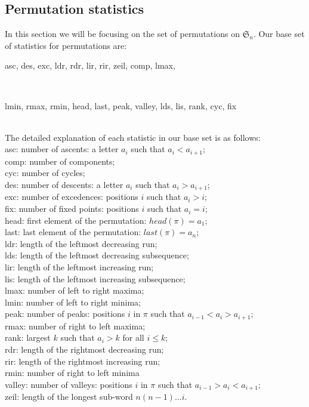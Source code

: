 \documentclass[12pt]{article}
\begin{document}
\subsection{Permutation statistics}
In this section we will be focusing on the set of permutations on $\mathfrak{S}_n$. Our base set of statistics for permutations are:\\ \centerline{asc, des, exc, ldr, rdr, lir, rir, zeil, comp, lmax,}\\
\centerline{lmin, rmax, rmin, head, last, peak, valley, lds, lis, rank, cyc, fix}\\
The detailed explanation of each statistic in our base set is as follows:\\
asc: number of ascents: a letter $a_i$ such that $a_i < a_{i+1}$;\\
comp: number of components;\\
cyc: number of cycles;\\
des: number of descents: a letter $a_i$ such that $a_i > a_{i+1}$;\\
exc: number of excedences: positions $i$ such that $a_i > i$;\\
fix: number of fixed points: positions $i$ such that $a_i = i$;\\
head: first element of the permutation: $head(\pi) = a_1$;\\
last: last element of the permutation: $last(\pi) = a_n$;\\
ldr: length of the leftmost decreasing run;\\
lds: length of the leftmost decreasing subsequence;\\
lir: length of the leftmost increasing run;\\
lis: length of the leftmost increasing subsequence;\\
lmax: number of left to right maxima;\\
lmin: number of left to right minima;\\
peak: number of peaks: positions $i$ in $\pi$ such that $a_{i-1} < a_i > a_{i+1}$;\\
rmax: number of right to left maxima;\\
rank: largest $k$ such that $a_i > k$ for all $i \leq k$;\\
rdr: length of the rightmost decreasing run;\\
rir: length of the rightmost increasing run;\\
rmin: number of right to left minima\\
valley: number of valleys: positions $i$ in $\pi$ such that $a_{i-1} > a_i < a_{i+1}$;\\
zeil: length of the longest sub-word $n(n-1)...i$.\\
\end{document}
